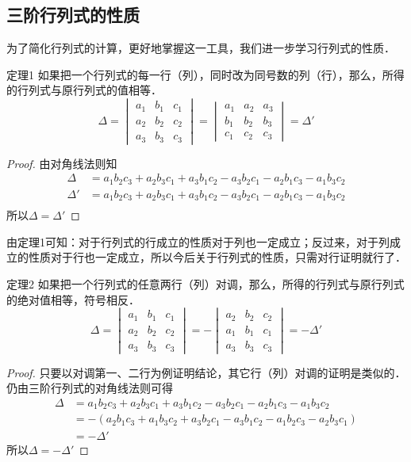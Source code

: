 \subsection{三阶行列式的性质}

为了简化行列式的计算，更好地掌握这一工具，我们进一步学习行列式的性质．

\begin{blk}{定理1 }
    如果把一个行列式的每一行（列），同时改为同号数的列（行），那么，所得的行列式与原行列式的值相等．
\[\Delta=\begin{vmatrix}
    a_1&b_1&c_1\\a_2&b_2&c_2\\a_3&b_3&c_3
\end{vmatrix}=\begin{vmatrix}
    a_1&a_2&a_3\\b_1&b_2&b_3\\c_1&c_2&c_3
\end{vmatrix}=\Delta'\]
\end{blk}

 \begin{proof}
由对角线法则知    
\[\begin{split}
    \Delta &=a_1b_2c_3+a_2b_3c_1+a_3b_1c_2-a_3b_2c_1-a_2b_1c_3-a_1b_3c_2\\
    \Delta'&=a_1b_2c_3+a_2b_3c_1+a_3b_1c_2-a_3b_2c_1-a_2b_1c_3-a_1b_3c_2\\
\end{split}\]
所以$\Delta=\Delta'$
 \end{proof}


 由定理1可知：对于行列式的行成立的性质对于列也一定成立；反过来，对于列成立的性质对于行也一定成立，所以今后关于行列式的性质，只需对行证明就行了．

\begin{blk}{定理2}
    如果把一个行列式的任意两行（列）对调，那么，所得的行列式与原行列式的绝对值相等，符号相反．
    \[\Delta=\begin{vmatrix}
        a_1&b_1&c_1\\a_2&b_2&c_2\\a_3&b_3&c_3
    \end{vmatrix}=-\begin{vmatrix}
        a_2&b_2&c_2\\a_1&b_1&c_1\\a_3&b_3&c_3
    \end{vmatrix}=-\Delta'\]
\end{blk} 

\begin{proof}
    只要以对调第一、二行为例证明结论，其它行（列）对调的证明是类似的．
    仍由三阶行列式的对角线法则可得
    \[\begin{split}
        \Delta&=a_1b_2c_3+a_2b_3c_1+a_3b_1c_2-a_3b_2c_1-a_2b_1c_3-a_1b_3c_2\\
        &=-(a_2b_1c_3+a_1b_3c_2+a_3b_2c_1-a_3b_1c_2-a_1b_2c_3-a_2b_3c_1)\\
        &=-\Delta'
    \end{split}\]
    所以$\Delta=-\Delta'$
\end{proof}


